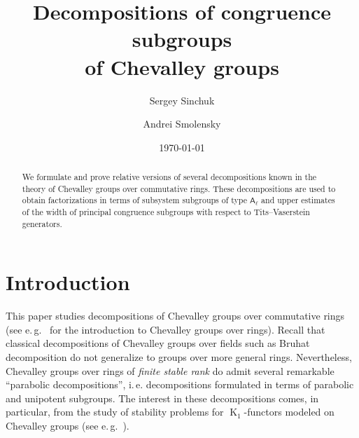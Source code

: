 \documentclass[11pt]{amsart}
\title[Decompositions of congruence subgroups of Chevalley groups]{Decompositions of congruence subgroups \\ of Chevalley groups}
\author{Sergey Sinchuk}
\author{Andrei Smolensky}
\date {\today}
\theoremstyle{plain}
\numberwithin{equation}{section}
\numberwithin{lemma}{section}
\theoremstyle{definition}
\theoremstyle{remark}
\DeclareMathOperator{\K}{K}
\newcommand{\rA}{\mathsf{A}}
\begin{document}
\begin{abstract} 
We formulate and prove relative versions of several decompositions known in the theory of Chevalley groups over commutative rings.
These decompositions are used to obtain factorizations in terms of subsystem subgroups of type $\rA_\ell$ and 
 upper estimates of the width of principal congruence subgroups with respect to Tits--Vaserstein generators.
\end{abstract}

\maketitle

\section{Introduction}\label{sec:intro}
This paper studies decompositions of Chevalley groups over commutative rings (see e.\,g.~\cite{VP} for the introduction to Chevalley groups over rings).
Recall that classical decompositions of Chevalley groups over fields such as Bruhat decomposition do not generalize to groups over more general rings.
Nevertheless, Chevalley groups over rings of {\it finite stable rank} do admit several remarkable ``parabolic decompositions'', i.\,e. decompositions formulated in terms of parabolic and unipotent subgroups.
The interest in these decompositions comes, in particular, from the study of stability problems for $\K_1$-functors modeled on Chevalley groups (see e.\,g.~\cite{St78, Si13}).
\end{document}

